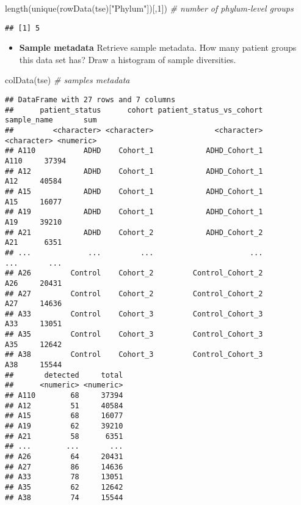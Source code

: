 \documentclass[
  oneside]{book}
\newenvironment{Shaded}{\begin{snugshade}}{\end{snugshade}}
\newcommand{\CommentTok}[1]{\textcolor[rgb]{0.56,0.35,0.01}{\textit{#1}}}
\newcommand{\DecValTok}[1]{\textcolor[rgb]{0.00,0.00,0.81}{#1}}
\newcommand{\FunctionTok}[1]{\textcolor[rgb]{0.00,0.00,0.00}{#1}}
\newcommand{\NormalTok}[1]{#1}
\newcommand{\StringTok}[1]{\textcolor[rgb]{0.31,0.60,0.02}{#1}}
\providecommand{\tightlist}{%
  \setlength{\itemsep}{0pt}\setlength{\parskip}{0pt}}
\begin{document}
\begin{Shaded}
\begin{Highlighting}[]
\FunctionTok{length}\NormalTok{(}\FunctionTok{unique}\NormalTok{(}\FunctionTok{rowData}\NormalTok{(tse)[}\StringTok{"Phylum"}\NormalTok{])[,}\DecValTok{1}\NormalTok{]) }\CommentTok{\# number of phylum{-}level groups}
\end{Highlighting}
\end{Shaded}

\begin{verbatim}
## [1] 5
\end{verbatim}

\begin{itemize}
\tightlist
\item
  \textbf{Sample metadata} Retrieve sample metadata. How many patient
  groups this data set has? Draw a histogram of sample
  diversities.
\end{itemize}

\begin{Shaded}
\begin{Highlighting}[]
\FunctionTok{colData}\NormalTok{(tse) }\CommentTok{\# samples metadata}
\end{Highlighting}
\end{Shaded}

\begin{verbatim}
## DataFrame with 27 rows and 7 columns
##      patient_status      cohort patient_status_vs_cohort sample_name       sum
##         <character> <character>              <character> <character> <numeric>
## A110           ADHD    Cohort_1            ADHD_Cohort_1        A110     37394
## A12            ADHD    Cohort_1            ADHD_Cohort_1         A12     40584
## A15            ADHD    Cohort_1            ADHD_Cohort_1         A15     16077
## A19            ADHD    Cohort_1            ADHD_Cohort_1         A19     39210
## A21            ADHD    Cohort_2            ADHD_Cohort_2         A21      6351
## ...             ...         ...                      ...         ...       ...
## A26         Control    Cohort_2         Control_Cohort_2         A26     20431
## A27         Control    Cohort_2         Control_Cohort_2         A27     14636
## A33         Control    Cohort_3         Control_Cohort_3         A33     13051
## A35         Control    Cohort_3         Control_Cohort_3         A35     12642
## A38         Control    Cohort_3         Control_Cohort_3         A38     15544
##       detected     total
##      <numeric> <numeric>
## A110        68     37394
## A12         51     40584
## A15         68     16077
## A19         62     39210
## A21         58      6351
## ...        ...       ...
## A26         64     20431
## A27         86     14636
## A33         78     13051
## A35         62     12642
## A38         74     15544
\end{verbatim}
\end{document}
